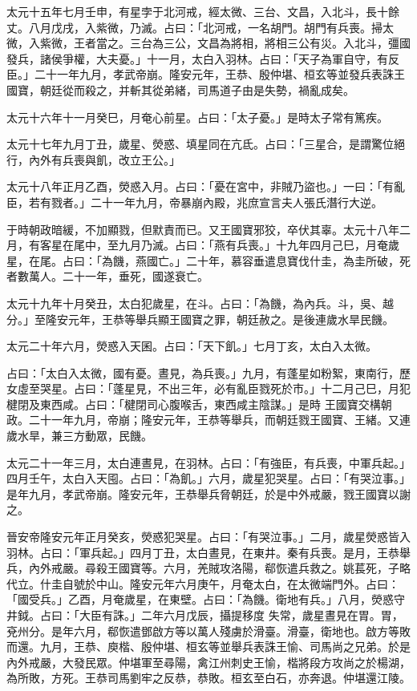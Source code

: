 \begin{pinyinscope}
 太元十五年七月壬申，有星孛于北河戒，經太微、三台、文昌，入北斗，長十餘丈。八月戊戌，入紫微，乃滅。占曰：「北河戒，一名胡門。胡門有兵喪。掃太微，入紫微，王者當之。三台為三公，文昌為將相，將相三公有災。入北斗，彊國
 發兵，諸侯爭權，大夫憂。」十一月，太白入羽林。占曰：「天子為軍自守，有反臣。」二十一年九月，孝武帝崩。隆安元年，王恭、殷仲堪、桓玄等並發兵表誅王國寶，朝廷從而殺之，并斬其從弟緒，司馬道子由是失勢，禍亂成矣。



 太元十六年十一月癸巳，月奄心前星。占曰：「太子憂。」是時太子常有篤疾。



 太元十七年九月丁丑，歲星、熒惑、填星同在亢氐。占曰：「三星合，是謂驚位絕行，內外有兵喪與飢，改立王公。」



 太元十八年正月乙酉，熒惑入月。占曰：「憂在宮中，非賊乃盜也。」一曰：「有亂臣，若有戮者。」二十一年九月，帝暴崩內殿，兆庶宣言夫人張氏潛行大逆。



 于時朝政暗緩，不加顯戮，但默責而已。又王國寶邪狡，卒伏其辜。太元十八年二月，有客星在尾中，至九月乃滅。占曰：「燕有兵喪。」十九年四月己巳，月奄歲星，在尾。占曰：「為饑，燕國亡。」二十年，慕容垂遣息寶伐什圭，為圭所破，死者數萬人。二十一年，垂死，國遂衰亡。



 太元十九年十月癸丑，太白犯歲星，在斗。占曰：「為饑，為內兵。斗，吳、越分。」至隆安元年，王恭等舉兵顯王國寶之罪，朝廷赦之。是後連歲水旱民饑。



 太元二十年六月，熒惑入天囷。占曰：「天下飢。」七月丁亥，太白入太微。



 占曰：「太白入太微，國有憂。晝見，為兵喪。」九月，有蓬星如粉絮，東南行，歷女虛至哭星。占曰：「蓬星見，不出三年，必有亂臣戮死於市。」十二月己巳，月犯楗閉及東西咸。占曰：「楗閉司心腹喉舌，東西咸主陰謀。」是時
 王國寶交構朝政。二十一年九月，帝崩；隆安元年，王恭等舉兵，而朝廷戮王國寶、王緒。又連歲水旱，兼三方動眾，民饑。



 太元二十一年三月，太白連晝見，在羽林。占曰：「有強臣，有兵喪，中軍兵起。」四月壬午，太白入天囤。占曰：「為飢。」六月，歲星犯哭星。占曰：「有哭泣事。」是年九月，孝武帝崩。隆安元年，王恭舉兵脅朝廷，於是中外戒嚴，戮王國寶以謝之。



 晉安帝隆安元年正月癸亥，熒惑犯哭星。占曰：「有哭泣事。」二月，歲星熒惑皆入羽林。占曰：「軍兵起。」四月丁丑，太白晝見，在東井。秦有兵喪。是月，王恭舉兵，內外戒嚴。尋殺王國寶等。六月，羌賊攻洛陽，郗恢遣兵救之。姚萇死，子略代立。什圭自號於中山。隆安元年六月庚午，月奄太白，在太微端門外。占曰：「國受兵。」乙酉，月奄歲星，在東壁。占曰：「為饑。衛地有兵。」八月，熒惑守井鉞。占曰：「大臣有誅。」二年六月戊辰，攝提移度
 失常，歲星晝見在胃。胃，兗州分。是年六月，郗恢遣鄧啟方等以萬人殘虜於滑臺。滑臺，衛地也。啟方等敗而還。九月，王恭、庾楷、殷仲堪、桓玄等並舉兵表誅王愉、司馬尚之兄弟。於是內外戒嚴，大發民眾。仲堪軍至尋陽，禽江州刺史王愉，楷將段方攻尚之於楊湖，為所敗，方死。王恭司馬劉牢之反恭，恭敗。桓玄至白石，亦奔退。仲堪還江陵。




\end{pinyinscope}
